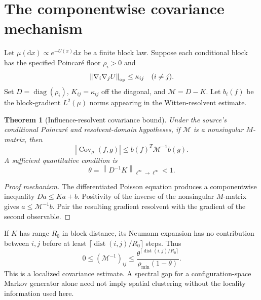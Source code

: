 \documentclass[11pt,a4paper,oneside]{book}
\theoremstyle{plain}
\newtheorem{theorem}{Theorem}[chapter]
\theoremstyle{definition}
\theoremstyle{remark}
\newcommand{\dd}{\mathrm d}
\newcommand{\Cov}{\operatorname{Cov}}
\newcommand{\dist}{\operatorname{dist}}
\newcommand{\diag}{\operatorname{diag}}
\newcommand{\norm}[1]{\left\lVert#1\right\rVert}
\newcommand{\src}[2]{\cite{#1}}
\begin{document}
\section{The componentwise covariance mechanism}
Let $\mu(\dd x)\propto e^{-U(x)}\dd x$ be a finite block law. Suppose each conditional block has the specified Poincar\'e floor $\rho_i>0$ and
\begin{equation}
 \norm{\nabla_i\nabla_jU}_{\rm op}\le\kappa_{ij}\quad(i\ne j).
\end{equation}
Set $D=\diag(\rho_i)$, $K_{ij}=\kappa_{ij}$ off the diagonal, and $\mathcal M=D-K$. Let $b_i(f)$ be the block-gradient $L^2(\mu)$ norms appearing in the Witten-resolvent estimate.

\begin{theorem}[Influence-resolvent covariance bound]
\label{thm:covariance}
Under the source's conditional Poincar\'e and resolvent-domain hypotheses, if $\mathcal M$ is a nonsingular $M$-matrix, then
\begin{equation}
 |\Cov_\mu(f,g)|\le b(f)^T\mathcal M^{-1}b(g).
 \label{eq:covariance-bound}
\end{equation}
A sufficient quantitative condition is
\begin{equation}
 \theta=\norm{D^{-1}K}_{\ell^\infty\to\ell^\infty}<1.
 \label{eq:influence}
\end{equation}
\end{theorem}
\begin{proof}[Proof mechanism]
The differentiated Poisson equation produces a componentwise inequality $Da\le Ka+b$. Positivity of the inverse of the nonsingular $M$-matrix gives $a\le\mathcal M^{-1}b$. Pair the resulting gradient resolvent with the gradient of the second observable.
\end{proof}
\src{R16}{thm:v16v84-sweeping,thm:v16v84-covariance}

If $K$ has range $R_0$ in block distance, its Neumann expansion has no contribution between $i,j$ before at least $\lceil\dist(i,j)/R_0\rceil$ steps. Thus
\begin{equation}
 0\le(\mathcal M^{-1})_{ij}
 \le\frac{\theta^{\lceil\dist(i,j)/R_0\rceil}}
 {\rho_{\min}(1-\theta)}.
 \label{eq:inverse-decay}
\end{equation}
This is a localized covariance estimate. A spectral gap for a configuration-space Markov generator alone need not imply spatial clustering without the locality information used here. \src{R16}{prop:v16v84-inverse-decay,prop:v16v84-gap-no-cluster}
\end{document}
